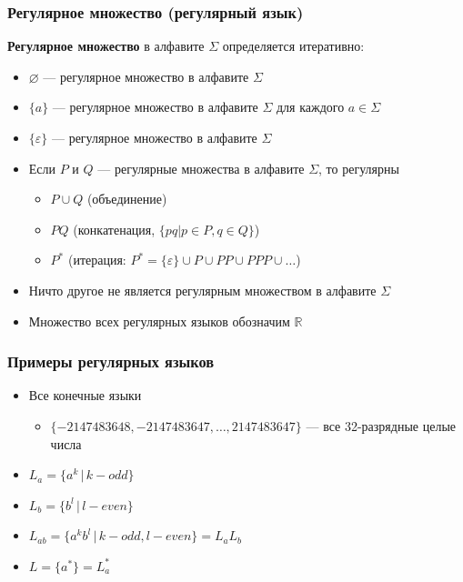 \documentclass{beamer}
\begin{document}
\begin{frame}[fragile]
  \transwipe[direction=90]
  \frametitle{Регулярное множество (регулярный язык)}
    \textbf{Регулярное множество} в алфавите $\Sigma$ определяется итеративно:
    \begin{itemize}
      \item $\varnothing $ --- регулярное множество в алфавите $\Sigma$
      \item $\{a\}$  --- регулярное множество в алфавите $\Sigma$ для каждого $a \in \Sigma$
      \item $\{\varepsilon\}$  --- регулярное множество в алфавите $\Sigma$
      \item Если $P$ и $Q$ --- регулярные множества в алфавите $\Sigma$, то регулярны
      \begin{itemize}
        \item $P \cup Q$ (объединение)
        \item $PQ$ (конкатенация, $\{ pq | p \in P, q \in Q\}$)
        \item $P^*$ (итерация: $P^* = \{\varepsilon\} \cup P \cup PP \cup PPP \cup \dots $)
      \end{itemize}
      \item Ничто другое не является регулярным множеством в алфавите $\Sigma$
      \item Множество всех регулярных языков обозначим $\mathbb{R}$
    \end{itemize}
\end{frame}

\begin{frame}[fragile]
  \transwipe[direction=90]
  \frametitle{Примеры регулярных языков}
  \begin{itemize}
   \item Все конечные языки
    \begin{itemize}
     \item $\{-2 147 483 648, -2 147 483 647, \dots,  2 147 483 647\}$ --- все 32-разрядные целые числа
    \end{itemize}
    \item $L_a = \{a^k \, | \, k - odd \} $
    \item $L_b = \{b^l \, | \, l - even \} $
    \item $L_{ab} = \{a^k b^l \, | \, k - odd, l - even\} =  L_a L_b$   
    \item $L = \{a^*\} = L_a^*$
  \end{itemize}
  
  
\end{frame}
\end{document}
